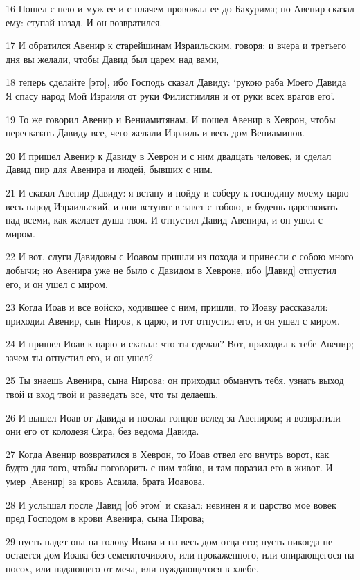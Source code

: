 \par 16 Пошел с нею и муж ее и с плачем провожал ее до Бахурима; но Авенир сказал ему: ступай назад. И он возвратился.
\par 17 И обратился Авенир к старейшинам Израильским, говоря: и вчера и третьего дня вы желали, чтобы Давид был царем над вами,
\par 18 теперь сделайте [это], ибо Господь сказал Давиду: `рукою раба Моего Давида Я спасу народ Мой Израиля от руки Филистимлян и от руки всех врагов его'.
\par 19 То же говорил Авенир и Вениамитянам. И пошел Авенир в Хеврон, чтобы пересказать Давиду все, чего желали Израиль и весь дом Вениаминов.
\par 20 И пришел Авенир к Давиду в Хеврон и с ним двадцать человек, и сделал Давид пир для Авенира и людей, бывших с ним.
\par 21 И сказал Авенир Давиду: я встану и пойду и соберу к господину моему царю весь народ Израильский, и они вступят в завет с тобою, и будешь царствовать над всеми, как желает душа твоя. И отпустил Давид Авенира, и он ушел с миром.
\par 22 И вот, слуги Давидовы с Иоавом пришли из похода и принесли с собою много добычи; но Авенира уже не было с Давидом в Хевроне, ибо [Давид] отпустил его, и он ушел с миром.
\par 23 Когда Иоав и все войско, ходившее с ним, пришли, то Иоаву рассказали: приходил Авенир, сын Ниров, к царю, и тот отпустил его, и он ушел с миром.
\par 24 И пришел Иоав к царю и сказал: что ты сделал? Вот, приходил к тебе Авенир; зачем ты отпустил его, и он ушел?
\par 25 Ты знаешь Авенира, сына Нирова: он приходил обмануть тебя, узнать выход твой и вход твой и разведать все, что ты делаешь.
\par 26 И вышел Иоав от Давида и послал гонцов вслед за Авениром; и возвратили они его от колодезя Сира, без ведома Давида.
\par 27 Когда Авенир возвратился в Хеврон, то Иоав отвел его внутрь ворот, как будто для того, чтобы поговорить с ним тайно, и там поразил его в живот. И умер [Авенир] за кровь Асаила, брата Иоавова.
\par 28 И услышал после Давид [об этом] и сказал: невинен я и царство мое вовек пред Господом в крови Авенира, сына Нирова;
\par 29 пусть падет она на голову Иоава и на весь дом отца его; пусть никогда не остается дом Иоава без семеноточивого, или прокаженного, или опирающегося на посох, или падающего от меча, или нуждающегося в хлебе.
